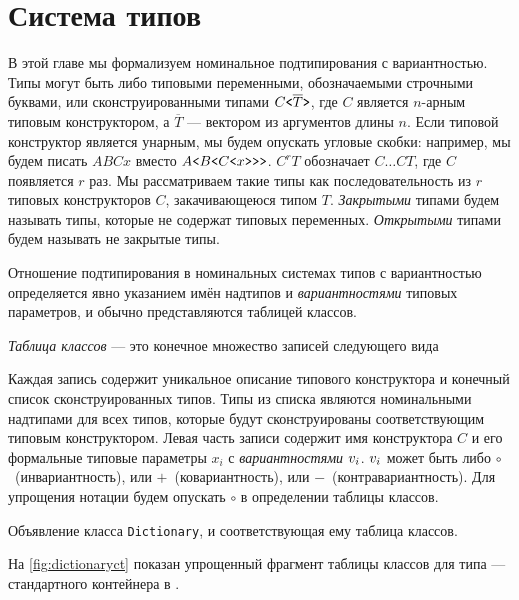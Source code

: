 \section{Система типов\protect\footnotemark}

В этой главе мы формализуем номинальное подтипирования с вариантностью. Типы могут быть либо типовыми переменными, обозначаемыми строчными буквами, или сконструированными типами $C\texttt{<}\overline{T}\texttt{>}$, где $C$ является $n$-арным типовым конструктором, а $\overline{T}$ --- вектором из аргументов длины $n$. Если типовой конструктор является унарным, мы будем опускать угловые скобки: например, мы будем писать $ABCx$ вместо $A\texttt{<}B\texttt{<}C\texttt{<}x\texttt{>}\texttt{>}\texttt{>}$. $C^{r}T$ обозначает $C\ldots CT$, где $C$ появляется $r$ раз. Мы рассматриваем такие типы как последовательность из $r$ типовых конструкторов $C$, закачивающеюся типом $T$. \emph{Закрытыми} типами будем называть типы, которые не содержат типовых переменных. \emph{Открытыми} типами будем называть не закрытые типы.

Отношение подтипирования в номинальных системах типов с вариантностью определяется явно указанием имён надтипов и \emph{вариантностями} типовых параметров, и обычно представляются таблицей классов.

\begin{defn}
\emph{Таблица классов} --- это конечное множество записей следующего вида

Каждая запись содержит уникальное описание типового конструктора и конечный список сконструированных типов. Типы из списка являются номинальными надтипами для всех типов, которые будут сконструированы соответствующим типовым конструктором. Левая часть записи содержит имя конструктора $C$ и его формальные типовые параметры $x_{i}$ с \emph{вариантностями} $v_i$. \(v_i\) может быть либо \(\circ\)~(инвариантность), или \(+\)~(ковариантность), или \(-\)~(контравариантность). Для упрощения нотации будем опускать $\circ$ в определении таблицы классов.
\end{defn}

\begin{Listing}
\small{}
\caption{Объявление класса \texttt{Dictionary}, и соответствующая ему таблица классов.}
\label{fig:dictionaryct}
\end{Listing}

\begin{exmp}
На \autoref{fig:dictionaryct} показан упрощенный фрагмент таблицы классов для типа \onector{\dictionarytype}{\xtype, \ytype} --- стандартного контейнера в \dotnet{}.
\end{exmp}


